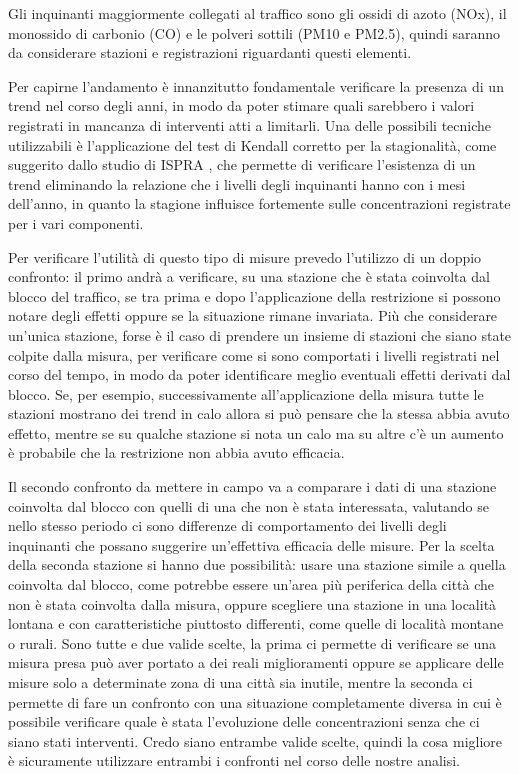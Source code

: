 \documentclass{article}
\begin{document}
Gli inquinanti maggiormente collegati al traffico sono gli ossidi di azoto (NOx), il monossido di carbonio (CO) e le polveri sottili (PM10 e PM2.5), quindi saranno da considerare stazioni e registrazioni riguardanti questi elementi.

Per capirne l'andamento è innanzitutto fondamentale verificare la presenza di un trend nel corso degli anni, in modo da poter stimare quali sarebbero i valori registrati in mancanza di interventi atti a limitarli. Una delle possibili tecniche utilizzabili è l'applicazione del test di Kendall corretto per la stagionalità, come suggerito dallo studio di ISPRA \cite{cattani2014analisi}, che permette di verificare l'esistenza di un trend eliminando la relazione che i livelli degli inquinanti hanno con i mesi dell'anno, in quanto la stagione influisce fortemente sulle concentrazioni registrate per i vari componenti.   

Per verificare l'utilità di questo tipo di misure prevedo l'utilizzo di un doppio confronto: il primo andrà a verificare, su una stazione che è stata coinvolta dal blocco del traffico, se tra prima e dopo l'applicazione della restrizione si possono notare degli effetti oppure se la situazione rimane invariata.
Più che considerare un'unica stazione, forse è il caso di prendere un insieme di stazioni che siano state colpite dalla misura, per verificare come si sono comportati i livelli registrati nel corso del tempo, in modo da poter identificare meglio eventuali effetti derivati dal blocco. Se, per esempio, successivamente all'applicazione della misura tutte le stazioni mostrano dei trend in calo allora si può pensare che la stessa abbia avuto effetto, mentre se su qualche stazione si nota un calo ma su altre c'è un aumento è probabile che la restrizione non abbia avuto efficacia.

Il secondo confronto da mettere in campo va a comparare i dati di una stazione coinvolta dal blocco con quelli di una che non è stata interessata, valutando se nello stesso periodo ci sono differenze di comportamento dei livelli degli inquinanti che possano suggerire un'effettiva efficacia delle misure.
Per la scelta della seconda stazione si hanno due possibilità: usare una stazione simile a quella coinvolta dal blocco, come potrebbe essere un'area più periferica della città che non è stata coinvolta dalla misura, oppure scegliere una stazione in una località lontana e con caratteristiche piuttosto differenti, come quelle di località montane o rurali. Sono tutte e due valide scelte, la prima ci permette di verificare se una misura presa può aver portato a dei reali miglioramenti oppure se applicare delle misure solo a determinate zona di una città sia inutile, mentre la seconda ci permette di fare un confronto con una situazione completamente diversa in cui è possibile verificare quale è stata l'evoluzione delle concentrazioni senza che ci siano stati interventi. Credo siano entrambe valide scelte, quindi la cosa migliore è sicuramente utilizzare entrambi i confronti nel corso delle nostre analisi.
\end{document}
